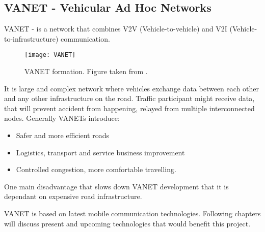 \subsection{VANET - Vehicular Ad Hoc Networks}

VANET - is a network that combines V2V (Vehicle-to-vehicle) and V2I (Vehicle-to-infrastructure) communication.\par
% 
\begin{figure}[h]
\texttt{[image: VANET]}
\caption{VANET formation. Figure taken from \cite{Jia2016ASystems}.}
\centering
\label{fig:VANETformation}
\end{figure}
% 
It is large and complex network where vehicles exchange data between each other and any other infrastructure on the road. Traffic participant might receive data, that will prevent accident from happening, relayed from multiple interconnected nodes. Generally VANETs introduce:

\begin{itemize}
    \item Safer and more efficient roads
    \item Logistics, transport and service business improvement
    \item Controlled congestion, more comfortable travelling.
\end{itemize}

One main disadvantage that slows down VANET development that it is dependant on expensive road infrastructure\footnotemark.\par
% 
% 
VANET is based on latest mobile communication technologies. Following chapters will discuss present and upcoming technologies that would benefit this project.











